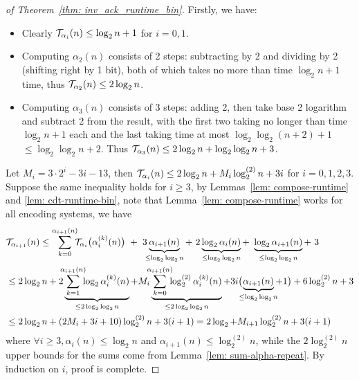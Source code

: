 \begin{proof}[\emph{of Theorem~\ref{thm: inv_ack_runtime_bin}}]
	Firstly, we have:
	\begin{itemize}
		\item Clearly $\mathcal{T}_{\alpha_i}(n)\le \log_2n + 1$ for $i = 0, 1$.
		\item Computing $\alpha_2(n)$ consists of 2 steps: subtracting by 2 and dividing by 2 (shifting right by 1 bit), both of which takes no more than time $\log_2n + 1$ time, thus $\mathcal{T}_{\alpha_2}(n)\le 2\log_2n$.
		\item Computing $\alpha_3(n)$ consists of 3 steps: adding 2, then take base 2 logarithm and subtract 2 from the result, with the first two taking no longer than time $\log_2n + 1$ each and the last taking time at most $\log_2\log_2(n+2) + 1$ $\le \log_2\log_2 n + 2$. Thus $\mathcal{T}_{\alpha_3}(n)\le 2\log_2n + \log_2\log_2n + 3$.
	\end{itemize}
  Let $M_i = 3\cdot 2^i - 3i - 13$, then $\mathcal{T}_{\alpha_i}(n)\le 2\log_2n + M_i\log_2^{(2)}n + 3i$ for $i = 0, 1, 2, 3$.
	Suppose the same inequality holds for $i\ge 3$, by Lemmas~\ref{lem: compose-runtime} and \ref{lem: cdt-runtime-bin}, note that Lemma~\ref{lem: compose-runtime} works for all encoding systems, we have
	\begin{equation*}
	\begin{aligned}
	& \runtime_{\alpha_{i+1}}(n) \le
	\sum_{k=0}^{\alpha_{i+1}(n)} \hspace{-5pt} \runtime_{\alpha_i}\big(\alpha_i^{(k)}(n)\big)
	\ + \ 3\hspace{-4pt}\underbrace{\alpha_{i+1}(n)}_{\le \log_2\log_2n}
	+ \ 2\underbrace{\log_2\alpha_i(n)}_{\le \log_2\log_2n}
	+ \ \underbrace{\log_2\alpha_{i+1}(n)}_{\le \log_2\log_2n} + \ 3 \\
	& \le 2\log_2n
	+ 2\underbrace{\hspace{-5pt}\sum_{k=1}^{\alpha_{i+1}(n)}\hspace{-5pt} \log_2\alpha_i^{(k)}(n)}_{\le 2\log_2\log_2n}
	+ M_i\underbrace{\hspace{-5pt}\sum_{k=0}^{\alpha_{i+1}(n)}\hspace{-5pt} \log_2^{(2)}\alpha_i^{(k)}(n)}_{\le 2\log_2\log_2n}
	+ 3i\big(\hspace{-5.5pt}\underbrace{\alpha_{i+1}(n)}_{\le \log_2\log_2n}\hspace{-4pt} + 1\big) + 6\log_2^{(2)}n + 3 \\
	& \le 2\log_2n + (2M_i + 3i + 10)\log_2^{(2)}n + 3(i + 1)
	= 2\log_2 + M_{i+1}\log_2^{(2)}n + 3(i + 1)
	\end{aligned}
	\end{equation*}
	where $\forall i\ge 3, \alpha_i(n)\le \log_2n$ and $\alpha_{i+1}(n)\le \log_2^{(2)}n$, while the $2\log_2^{(2)}n$ upper bounds for the sums come from Lemma~\ref{lem: sum-alpha-repeat}.
	By induction on $i$, proof is complete.
\end{proof}
